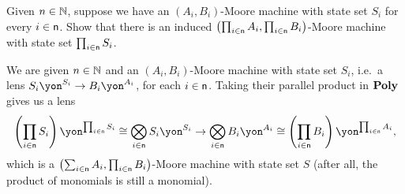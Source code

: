 \documentclass[Book-Poly]{subfiles}
\begin{document}
\begin{exercise}
Given $n\in\mathbb{N}$, suppose we have an $(A_i,B_i)$-Moore machine with state set $S_i$ for every $i \in \mathsf{n}$.
Show that there is an induced $\left(\prod_{i \in \mathsf{n}} A_i, \prod_{i \in \mathsf{n}} B_i\right)$-Moore machine with state set $\prod_{i \in \mathsf{n}} S_i$.
\begin{solution}
We are given $n\in\mathbb{N}$ and an $(A_i,B_i)$-Moore machine with state set $S_i$, i.e.\ a lens $S_i\yon^{S_i}\to B_i\yon^{A_i}$, for each $i\in\mathsf{n}$.
Taking their parallel product in $\mathbf{Poly}$ gives us a lens
\[
    \left(\prod_{i\in\ord{n}}S_i\right)\yon^{\prod_{i\in\ord{n}}S_i}\iso\bigotimes_{i\in\ord{n}}S_i\yon^{S_i}\to\bigotimes_{i\in\ord{n}}B_i\yon^{A_i}\iso\left(\prod_{i\in\ord{n}}B_i\right)\yon^{\prod_{i\in\ord{n}}A_i},
\]
which is a $\left(\sum_{i \in \mathsf{n}} A_i, \prod_{i \in \mathsf{n}} B_i\right)$-Moore machine with state set $S$ (after all, the product of monomials is still a monomial).
\end{solution}
\end{exercise}
\end{document}
